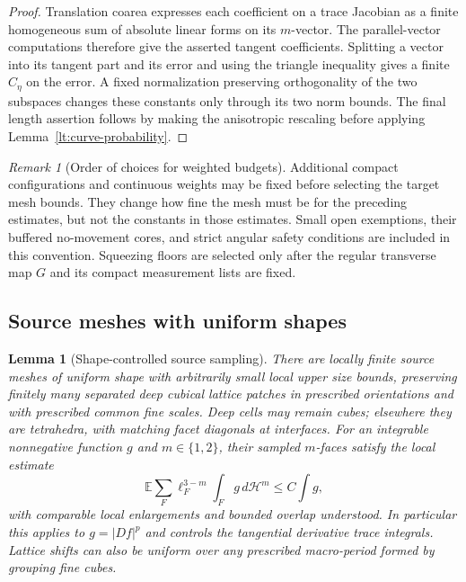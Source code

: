 \documentclass[11pt]{article}
\numberwithin{equation}{section}
\newtheorem{lemma}[theorem]{Lemma}
\theoremstyle{definition}
\theoremstyle{remark}
\newtheorem{remark}[theorem]{Remark}
\begin{document}
\begin{proof}
Translation coarea expresses each coefficient on a trace
Jacobian as a finite homogeneous sum of absolute linear forms
on its $m$-vector.  The parallel-vector computations therefore
give the asserted tangent coefficients.  Splitting a vector
into its tangent part and its error and using the triangle
inequality gives a finite $C_\eta$ on the error.  A fixed
normalization preserving orthogonality of the two subspaces
changes these constants only through its two norm bounds.
The final length assertion follows by making the anisotropic
rescaling before applying Lemma~\ref{lt:curve-probability}.
\end{proof}

\begin{remark}[Order of choices for weighted budgets]
\label{lt:weighted-order}
Additional compact configurations and continuous weights may be
fixed before selecting the target mesh bounds.  They change how
fine the mesh must be for the preceding estimates, but not the
constants in those estimates.  Small open exemptions, their
buffered no-movement cores, and strict angular safety conditions
are included in this convention.  Squeezing floors are selected
only after the regular transverse map $G$ and its compact
measurement lists are fixed.
\end{remark}

\subsection{Source meshes with uniform shapes}

\begin{lemma}[Shape-controlled source sampling]
\label{lt:source-mesh}
There are locally finite source meshes of uniform shape with
arbitrarily small local upper size bounds, preserving finitely
many separated deep cubical lattice patches in prescribed
orientations and with prescribed common fine scales.  Deep
cells may remain cubes; elsewhere they are tetrahedra, with
matching facet diagonals at interfaces.  For an integrable
nonnegative function $g$ and $m\in\{1,2\}$, their sampled
$m$-faces satisfy the local estimate
\begin{equation}
 \mathbb E\sum_F \ell_F^{3-m}\int_F g\,d\mathcal H^m
                    \leq C\int g,
 \label{lt:source-fubini}
\end{equation}
with comparable local enlargements and bounded overlap understood.
In particular this applies to $g=|Df|^p$ and controls the
tangential derivative trace integrals.  Lattice shifts can also
be uniform over any prescribed macro-period formed by grouping
fine cubes.
\end{lemma}
\end{document}
